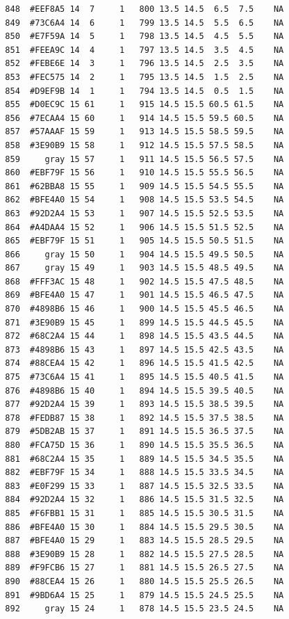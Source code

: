 \documentclass[12pt,twoside]{reedthesis}
\begin{document}
\begin{verbatim}
  848  #EEF8A5 14  7     1   800 13.5 14.5  6.5  7.5    NA
  849  #73C6A4 14  6     1   799 13.5 14.5  5.5  6.5    NA
  850  #E7F59A 14  5     1   798 13.5 14.5  4.5  5.5    NA
  851  #FEEA9C 14  4     1   797 13.5 14.5  3.5  4.5    NA
  852  #FEBE6E 14  3     1   796 13.5 14.5  2.5  3.5    NA
  853  #FEC575 14  2     1   795 13.5 14.5  1.5  2.5    NA
  854  #D9EF9B 14  1     1   794 13.5 14.5  0.5  1.5    NA
  855  #D0EC9C 15 61     1   915 14.5 15.5 60.5 61.5    NA
  856  #7ECAA4 15 60     1   914 14.5 15.5 59.5 60.5    NA
  857  #57AAAF 15 59     1   913 14.5 15.5 58.5 59.5    NA
  858  #3E90B9 15 58     1   912 14.5 15.5 57.5 58.5    NA
  859     gray 15 57     1   911 14.5 15.5 56.5 57.5    NA
  860  #EBF79F 15 56     1   910 14.5 15.5 55.5 56.5    NA
  861  #62BBA8 15 55     1   909 14.5 15.5 54.5 55.5    NA
  862  #BFE4A0 15 54     1   908 14.5 15.5 53.5 54.5    NA
  863  #92D2A4 15 53     1   907 14.5 15.5 52.5 53.5    NA
  864  #A4DAA4 15 52     1   906 14.5 15.5 51.5 52.5    NA
  865  #EBF79F 15 51     1   905 14.5 15.5 50.5 51.5    NA
  866     gray 15 50     1   904 14.5 15.5 49.5 50.5    NA
  867     gray 15 49     1   903 14.5 15.5 48.5 49.5    NA
  868  #FFF3AC 15 48     1   902 14.5 15.5 47.5 48.5    NA
  869  #BFE4A0 15 47     1   901 14.5 15.5 46.5 47.5    NA
  870  #4898B6 15 46     1   900 14.5 15.5 45.5 46.5    NA
  871  #3E90B9 15 45     1   899 14.5 15.5 44.5 45.5    NA
  872  #68C2A4 15 44     1   898 14.5 15.5 43.5 44.5    NA
  873  #4898B6 15 43     1   897 14.5 15.5 42.5 43.5    NA
  874  #88CEA4 15 42     1   896 14.5 15.5 41.5 42.5    NA
  875  #73C6A4 15 41     1   895 14.5 15.5 40.5 41.5    NA
  876  #4898B6 15 40     1   894 14.5 15.5 39.5 40.5    NA
  877  #92D2A4 15 39     1   893 14.5 15.5 38.5 39.5    NA
  878  #FEDB87 15 38     1   892 14.5 15.5 37.5 38.5    NA
  879  #5DB2AB 15 37     1   891 14.5 15.5 36.5 37.5    NA
  880  #FCA75D 15 36     1   890 14.5 15.5 35.5 36.5    NA
  881  #68C2A4 15 35     1   889 14.5 15.5 34.5 35.5    NA
  882  #EBF79F 15 34     1   888 14.5 15.5 33.5 34.5    NA
  883  #E0F299 15 33     1   887 14.5 15.5 32.5 33.5    NA
  884  #92D2A4 15 32     1   886 14.5 15.5 31.5 32.5    NA
  885  #F6FBB1 15 31     1   885 14.5 15.5 30.5 31.5    NA
  886  #BFE4A0 15 30     1   884 14.5 15.5 29.5 30.5    NA
  887  #BFE4A0 15 29     1   883 14.5 15.5 28.5 29.5    NA
  888  #3E90B9 15 28     1   882 14.5 15.5 27.5 28.5    NA
  889  #F9FCB6 15 27     1   881 14.5 15.5 26.5 27.5    NA
  890  #88CEA4 15 26     1   880 14.5 15.5 25.5 26.5    NA
  891  #9BD6A4 15 25     1   879 14.5 15.5 24.5 25.5    NA
  892     gray 15 24     1   878 14.5 15.5 23.5 24.5    NA

\end{verbatim}
\end{document}
